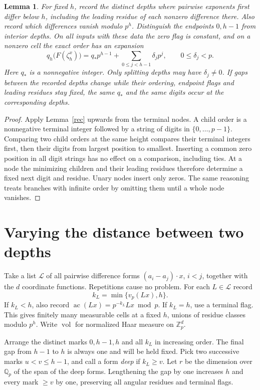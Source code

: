 \documentclass[11pt]{article}
\newtheorem{lemma}[theorem]{Lemma}
\newcommand{\Z}{\mathbb Z}
\newcommand{\Q}{\mathbb Q}
\newcommand{\vol}{\operatorname{vol}}
\newcommand{\ac}{\operatorname{ac}}
\begin{document}
\begin{lemma}\label{digits}
For fixed $h$, record the distinct depths where pairwise exponents first differ below $h$, including the leading residue of each nonzero difference there. Also record which differences vanish modulo $p^h$. Distinguish the endpoints $0,h-1$ from interior depths. On all inputs with these data the zero flag is constant, and on a nonzero cell the exact order has an expansion
\[
q_h\big(F(\zeta_h^x)\big)=q_*p^{h-1}+\sum_{0\le j<h-1}\delta_j p^j,
\qquad 0\le\delta_j<p .
\]
Here $q_*$ is a nonnegative integer. Only splitting depths may have $\delta_j\ne0$. If gaps between the recorded depths change while their ordering, endpoint flags and leading residues stay fixed, the same $q_*$ and the same digits occur at the corresponding depths.
\end{lemma}
\begin{proof}
Apply Lemma~\ref{rec} upwards from the terminal nodes. A child order is a nonnegative terminal integer followed by a string of digits in $\{0,\ldots,p-1\}$. Comparing two child orders at the same height compares their terminal integers first, then their digits from largest position to smallest. Inserting a common zero position in all digit strings has no effect on a comparison, including ties. At a node the minimizing children and their leading residues therefore determine a fixed next digit and residue. Unary nodes insert only zeros. The same reasoning treats branches with infinite order by omitting them until a whole node vanishes.
\end{proof}

\section{Varying the distance between two depths}
Take a list $\mathcal L$ of all pairwise difference forms $(a_i-a_j)\cdot x$, $i<j$, together with the $d$ coordinate functions. Repetitions cause no problem. For each $L\in\mathcal L$ record
\[
k_L=\min\{v_p(Lx),h\}.
\]
If $k_L<h$, also record $\ac(Lx)=p^{-k_L}Lx\bmod p$. If $k_L=h$, use a terminal flag. This gives finitely many measurable cells at a fixed $h$, unions of residue classes modulo $p^h$. Write $\vol$ for normalized Haar measure on $\Z_p^d$.

Arrange the distinct marks $0,h-1,h$ and all $k_L$ in increasing order. The final gap from $h-1$ to $h$ is always one and will be held fixed. Pick two successive marks $u<v\le h-1$, and call a form \emph{deep} if $k_L\ge v$. Let $r$ be the dimension over $\Q_p$ of the span of the deep forms. Lengthening the gap by one increases $h$ and every mark $\ge v$ by one, preserving all angular residues and terminal flags.
\end{document}
